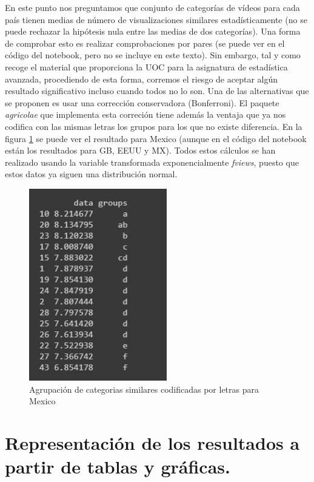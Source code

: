 \documentclass[a4paper,12pt]{article}
\begin{document}
En este punto nos preguntamos que conjunto de categor\'ias de v\'ideos para cada pa\'is tienen medias de n\'umero de visualizaciones similares estad\'isticamente (no se puede rechazar la hip\'otesis nula entre las medias de dos categor\'ias). Una forma de comprobar esto es realizar comprobaciones por pares (se puede ver en el c\'odigo del notebook, pero no se incluye en  este texto). Sin embargo, tal y como recoge el material que proporciona la UOC para la asignatura de estad\'istica avanzada, procediendo de esta forma, corremos el riesgo de aceptar alg\'un resultado significativo incluso cuando todos no lo son. Una de las alternativas que se proponen es usar una correcci\'on conservadora (Bonferroni). El paquete {\itshape agricolae} que implementa esta correci\'on tiene adem\'as la ventaja que ya nos codifica con las mismas letras los grupos para los que no existe diferencia. En la figura \ref{fig:Berro} se puede ver el resultado para Mexico (aunque en el c\'odigo del notebook est\'an los resultados para GB, EEUU y MX). Todos estos c\'alculos se han realizado usando la variable transformada exponencialmente {\itshape fviews}, puesto que estos datos ya siguen una distribuci\'on normal.

\begin{figure}[h!]
\centering
\includegraphics[width=6cm]{Berro.JPG}
\caption{Agrupaci\'on de categorias similares codificadas por letras para Mexico}
\label{fig:Berro}
\end{figure}

\section{Representaci\'on de los resultados a partir de tablas y gr\'aficas.}
\end{document}

